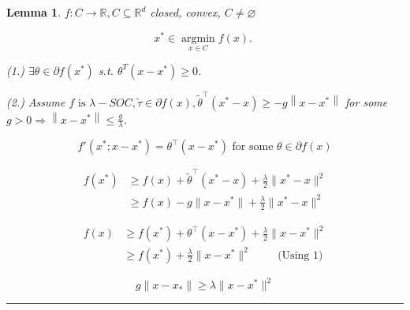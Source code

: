 \documentclass[twoside]{article}
\newtheorem{lemma}[theorem]{Lemma}
\newenvironment{proof}{{\bf Proof:}}{\hfill\rule{2mm}{2mm}}
\begin{document}
\begin{lemma}

$f : C \rightarrow \mathbb{R}, C \subseteq \mathbb{R}^{d}$ closed, convex, $C \neq \varnothing$

$$
x^{*} \in \underset{x \in C}{\operatorname{argmin}} f(x) \text {. }
$$


(1.) $\exists \theta \in \partial f\left(x^{*}\right)$ s.t. $\theta^{T}\left(x-x^{*}\right) \geq 0$.

(2.) Assume $f \text{ is } \lambda-S O C, \tilde{\tau} \in \partial f(x), \tilde{\theta}^{\top}\left(x^{*}-x\right) \geq-g\left\|x-x^{*}\right\|$ for some $g>0 \Rightarrow\left\|x-x^{*}\right\| \leq \frac{g}{\lambda}$.
\end{lemma}

\begin{proof}
\begin{equation*}
    f'(x^*; x-x^*) = \theta^\top (x-x^*) \text{ for some $\theta \in  \partial f(x)$}
\end{equation*}

\begin{align*}
    f(x^*) &\geqslant f(x) + \tilde{\theta}^\top (x^* - x) + \frac{\lambda}{2} \|x^* - x\|^2 \\
    &\geqslant f(x) - g \|x - x^*\| + \frac{\lambda}{2} \|x^* - x\|^2
\end{align*}

\begin{align*}
    f(x) &\geq f(x^*) + \theta^\top (x - x^*) + \frac{\lambda}{2} \|x - x^*\|^2 \\
    &\geqslant f(x^*) + \frac{\lambda}{2} \|x - x^*\|^2 \hspace{1cm} \text{(Using 1)}
\end{align*}

\begin{equation*}
    g \|x - x_*\| \geqslant \lambda \|x - x^*\|^2
\end{equation*}

\hspace{6cm} 

\end{proof}
\end{document}
